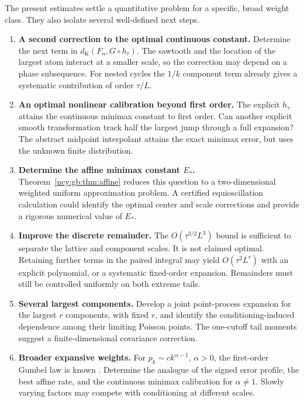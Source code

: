 \documentclass[11pt,letterpaper]{article}
\numberwithin{equation}{section}
\theoremstyle{remark}\newtheorem{remark}[theorem]{Remark}
\theoremstyle{definition}\newtheorem{definition}[theorem]{Definition}\theoremstyle{plain}
\newcommand{\DK}{d_{\mathrm K}}
\begin{document}
The present estimates settle a quantitative problem for a
specific, broad weight class. They also isolate several
well-defined next steps.

\begin{enumerate}
\item\label{ncy:gb:q:nextconst} \textbf{A second correction to the optimal continuous constant.}
Determine the next term in
\(\DK(F_n,G\circ h_\tau)\). The sawtooth and the location of the
largest atom interact at a smaller scale, so the correction may
depend on a phase subsequence. For nested cycles the
\(1/k\) component term already gives a systematic contribution
of order \(\tau/L\).

\item\label{ncy:gb:q:calibration} \textbf{An optimal nonlinear calibration beyond first order.}
The explicit \(h_\tau\) attains the continuous minimax constant
to first order. Can another explicit smooth transformation
track half the largest jump through a full expansion? The
abstract midpoint interpolant attains the exact minimax error,
but uses the unknown finite distribution.

\item\label{ncy:gb:q:affine} \textbf{Determine the affine minimax constant \(E_*\).}
Theorem~\ref{ncy:gb:thm:affine} reduces this question to a
two-dimensional weighted uniform approximation problem.
A certified equioscillation calculation could identify the
optimal center and scale corrections and provide a rigorous
numerical value of \(E_*\).

\item\label{ncy:gb:q:remainder} \textbf{Improve the discrete remainder.}
The \(O(\tau^{3/2}L^3)\) bound is sufficient to separate the
lattice and component scales. It is not claimed optimal.
Retaining further terms in the paired integral may yield
\(O(\tau^2L^r)\) with an explicit polynomial, or a systematic
fixed-order expansion. Remainders must still be controlled
uniformly on both extreme tails.

\item\label{ncy:gb:q:several} \textbf{Several largest components.}
Develop a joint point-process expansion for the largest
\(r\) components, with fixed \(r\), and identify the
conditioning-induced dependence among their limiting
Poisson points. The one-cutoff tail moments suggest a
finite-dimensional covariance correction.

\item\label{ncy:gb:q:expansive} \textbf{Broader expansive weights.}
For \(p_k\sim c k^{\alpha-1}\), \(\alpha>0\), the first-order
Gumbel law is known \cite{PR}. Determine the analogue of the
signed error profile, the best affine rate, and the
continuous minimax calibration for \(\alpha\ne1\).
Slowly varying factors may compete with conditioning at
different scales.


\end{enumerate}
\end{document}
